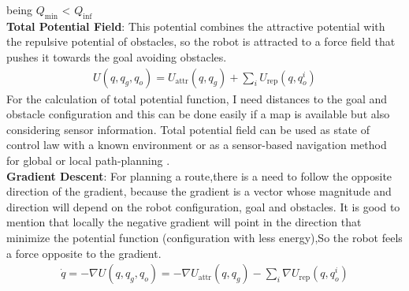 being $Q_{\text{min}}$ < $Q_{\text{inf}}$\\

\noindent \textbf {Total Potential Field}: This potential combines the attractive potential with the repulsive potential of obstacles, so the robot is attracted to a force field that pushes it towards the goal avoiding obstacles. 
\begin{equation}
\begin{aligned}
U(q, q_g, q_o) = U_{\text{attr}}(q, q_g) + \sum_i U_{\text{rep}}(q, q^{i}_o)
\end{aligned}
\label{eqn:Total Potential Field}
\end{equation} 
For the calculation of total potential function, I need distances to the goal and obstacle configuration and this can be done easily if a map is available but also considering sensor information. Total potential field can be used as state of control law with a known environment or as a sensor-based navigation method for global or local path-planning \cite{lu2014information}.  \\


\noindent \textbf {Gradient Descent}:
For planning a route,there is a need to follow the opposite direction of the gradient, because the gradient is a vector whose magnitude and direction will depend on the robot configuration, goal and obstacles. It is good to mention that locally the negative gradient will point in the direction that minimize the potential function (configuration with less energy),So the robot feels a force opposite to the gradient. \\
\begin{equation}
\begin{aligned}
\dot{q} = -\nabla U(q, q_g, q_o) = -\nabla U_{\text{attr}}(q, q_g) - \sum_i \nabla U_{\text{rep}}(q, q^{i}_o)
\end{aligned}
\label{eqn:Gradient Descent}
\end{equation} 

